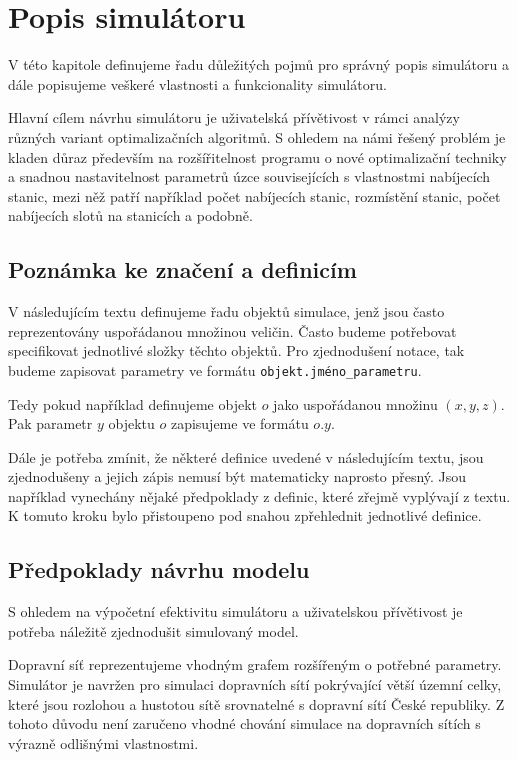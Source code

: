 \chapter{Popis simulátoru}
\label{chap:popis_simulatoru}

V této kapitole definujeme řadu důležitých pojmů pro správný popis simulátoru
a dále popisujeme veškeré vlastnosti a funkcionality simulátoru.

Hlavní cílem návrhu simulátoru je uživatelská přívětivost v rámci analýzy
různých variant optimalizačních algoritmů. S ohledem na námi řešený problém je 
kladen důraz především na rozšířitelnost programu o nové optimalizační techniky
a snadnou nastavitelnost parametrů úzce souvisejících
s vlastnostmi nabíjecích stanic, mezi něž patří například počet nabíjecích stanic, 
rozmístění stanic, počet nabíjecích slotů na stanicích a podobně.

\section{Poznámka ke značení a definicím}
V následujícím textu definujeme řadu objektů simulace, jenž jsou často reprezentovány
uspořádanou množinou veličin. Často budeme potřebovat specifikovat jednotlivé 
složky těchto objektů. Pro zjednodušení notace, tak budeme zapisovat parametry
ve formátu \texttt{objekt.jméno\_parametru}. 

Tedy pokud například definujeme objekt $o$ jako uspořádanou množinu $(x, y, z)$.
Pak parametr $y$ objektu $o$ zapisujeme ve formátu $o.y$.

Dále je potřeba zmínit, že některé definice uvedené v následujícím textu, jsou
zjednodušeny a jejich zápis nemusí být matematicky naprosto přesný. 
Jsou například vynechány nějaké předpoklady z definic, které zřejmě vyplývají z 
textu. K tomuto kroku bylo přistoupeno pod snahou zpřehlednit jednotlivé definice.


\section{Předpoklady návrhu modelu}
\label{sec:predpoklady_navrhu}
S ohledem na výpočetní efektivitu simulátoru a uživatelskou přívětivost je potřeba
náležitě zjednodušit simulovaný model.

Dopravní síť reprezentujeme vhodným grafem rozšířeným o potřebné parametry. Simulátor je
navržen pro simulaci dopravních sítí pokrývající větší územní celky, které jsou 
rozlohou a hustotou sítě srovnatelné s dopravní sítí České republiky. Z tohoto
důvodu není zaručeno vhodné chování simulace na dopravních sítích s výrazně odlišnými
vlastnostmi.

